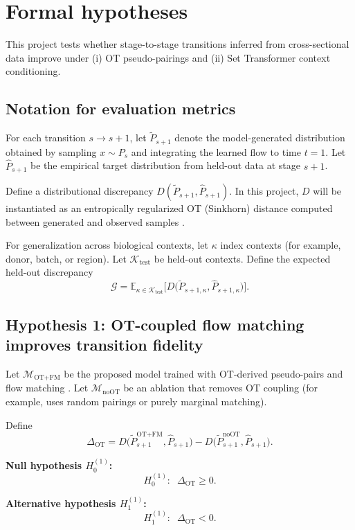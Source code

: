 \documentclass[conference]{IEEEtran}
\newcommand{\E}{\mathbb{E}}
\begin{document}
\section{Formal hypotheses}

This project tests whether stage-to-stage transitions inferred from cross-sectional data improve under (i) OT pseudo-pairings and (ii) Set Transformer context conditioning.

\subsection{Notation for evaluation metrics}

For each transition $s \rightarrow s+1$, let $\tilde{P}_{s+1}$ denote the model-generated distribution obtained by sampling $x \sim P_s$ and integrating the learned flow to time $t=1$. Let $\hat{P}_{s+1}$ be the empirical target distribution from held-out data at stage $s+1$.

Define a distributional discrepancy $D(\tilde{P}_{s+1}, \hat{P}_{s+1})$. In this project, $D$ will be instantiated as an entropically regularized OT (Sinkhorn) distance computed between generated and observed samples \cite{Cuturi2013-li}.

For generalization across biological contexts, let $\kappa$ index contexts (for example, donor, batch, or region). Let $\mathcal{K}_{\text{test}}$ be held-out contexts. Define the expected held-out discrepancy
\[
\mathcal{G}
=
\E_{\kappa \in \mathcal{K}_{\text{test}}}
\Big[
D\big(\tilde{P}_{s+1,\kappa}, \hat{P}_{s+1,\kappa}\big)
\Big].
\]

\subsection{Hypothesis 1: OT-coupled flow matching improves transition fidelity}

Let $\mathcal{M}_{\text{OT+FM}}$ be the proposed model trained with OT-derived pseudo-pairs and flow matching \cite{Lipman2022-ns,Bunne2023-bm}. Let $\mathcal{M}_{\text{noOT}}$ be an ablation that removes OT coupling (for example, uses random pairings or purely marginal matching).

Define
\[
\Delta_{\text{OT}}
=
D\big(\tilde{P}^{\text{OT+FM}}_{s+1}, \hat{P}_{s+1}\big)
-
D\big(\tilde{P}^{\text{noOT}}_{s+1}, \hat{P}_{s+1}\big).
\]

\textbf{Null hypothesis $H_0^{(1)}$:}
\[
H_0^{(1)}:\;\; \Delta_{\text{OT}} \ge 0.
\]

\textbf{Alternative hypothesis $H_1^{(1)}$:}
\[
H_1^{(1)}:\;\; \Delta_{\text{OT}} < 0.
\]
\end{document}

